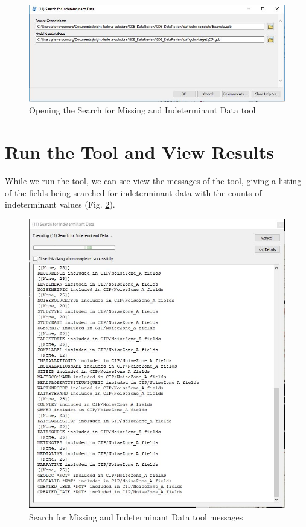 \documentclass[openany]{book}
\theoremstyle{definition}
\theoremstyle{definition}
\theoremstyle{definition}
\theoremstyle{remark}
\begin{document}
\begin{figure}[H]

{\centering \includegraphics{figures/indtSearch-params} 

}

\caption{Opening the Search for Missing and Indeterminant Data tool}\label{fig:indtSearchparams}
\end{figure}

\section{Run the Tool and View
Results}\label{run-the-tool-and-view-results-8}

While we run the tool, we can see view the messages of the tool, giving
a listing of the fields being searched for indeterminant data with the
counts of indeterminant values (Fig. \ref{fig:indtSearchmessages}).

\begin{figure}[H]

{\centering \includegraphics{figures/indtSearch-messages} 

}

\caption{Search for Missing and Indeterminant Data tool messages}\label{fig:indtSearchmessages}
\end{figure}
\end{document}
